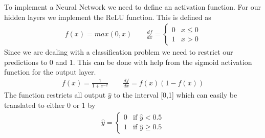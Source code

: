 \documentclass[11pt]{article}
\begin{document}
To implement a Neural Network we need to define an activation function. For our hidden layers we implement the ReLU function. This is defined as
\begin{align*}
    f(x) = max(0, x) \quad\quad \frac{d f }{dx} = \begin{cases}
        0 & x \leq 0 \\
        1 & x > 0
    \end{cases}
\end{align*}
Since we are dealing with a classification problem we need to restrict our predictions to 0 and 1. This can be done with help from the sigmoid activation function for the output layer.
\begin{align*}
    f(x) = \frac{1 }{1 + e^{-x}} \quad\quad \frac{df }{dx} = f(x)(1-f(x))
\end{align*}
The function restricts all output $\hat{y}$ to the interval [0,1] which can easily be translated to either 0 or 1 by
\begin{align*}
    \hat{y} =
    \begin{cases}
        0 & \text{if } \hat{y} < 0.5    \\
        1 & \text{if } \hat{y} \geq 0.5
    \end{cases}
\end{align*}
\end{document}

